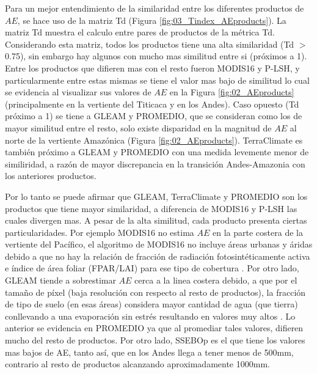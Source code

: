 \documentclass[12pt]{article}
\begin{document}
\thispagestyle{empty}

Para un mejor entendimiento de la similaridad entre los diferentes productos de $AE$, se hace uso de la matriz Td (Figura \ref{fig:03_Tindex_AEproducts}). La matriz Td muestra el calculo entre pares de productos de la métrica Td. Considerando esta matriz, todos los productos tiene una alta similaridad (Td $>$ 0.75), sin embargo hay algunos con mucho mas similitud entre si (próximos a 1). Entre los productos que difieren mas con el resto fueron MODIS16 y P-LSH, y particularmente entre estas mismas se tiene el valor mas bajo de similitud lo cual se evidencia al visualizar sus valores de $AE$ en la Figura \ref{fig:02_AEproducts} (principalmente en la vertiente del Titicaca y en los Andes). Caso opuesto (Td próximo a 1) se tiene a GLEAM y PROMEDIO, que se consideran como los de mayor similitud entre el resto, solo existe disparidad en la magnitud de $AE$ al norte de la vertiente Amazónica (Figura \ref{fig:02_AEproducts}). TerraClimate es también próximo a GLEAM y PROMEDIO con una medida levemente menor de similiridad, a razón de mayor discrepancia en la transición Andes-Amazonia con los anteriores productos.

Por lo tanto se puede afirmar que GLEAM, TerraClimate y PROMEDIO son los productos que tiene mayor similaridad, a diferencia de MODIS16 y P-LSH las cuales divergen mas. A pesar de la alta similitud, cada producto presenta ciertas particularidades. Por ejemplo MODIS16 no estima $AE$ en la parte costera de la vertiente del Pacífico, el algoritmo de MODIS16 no incluye áreas urbanas y áridas debido a que no hay la relación de fracción de radiación fotosintéticamente activa e índice de área foliar (FPAR/LAI) para ese tipo de cobertura \citep{mu2013modis}. Por otro lado, GLEAM tiende a sobrestimar $AE$ cerca a la linea costera debido, a que por el tamaño de píxel (baja resolución con respecto al resto de productos), la fracción de tipo de suelo (en esas áreas) considera mayor cantidad de agua (que tierra) conllevando a una evaporación sin estrés resultando en valores muy altos \citep{Martens2017}. Lo anterior se evidencia en PROMEDIO ya que al promediar tales valores, difieren mucho del resto de productos. Por otro lado, SSEBOp es el que tiene los valores mas bajos de AE, tanto así, que en los Andes llega a tener menos de 500mm, contrario al resto de productos alcanzando aproximadamente 1000mm.

\vspace*{.5cm}

\end{document}
